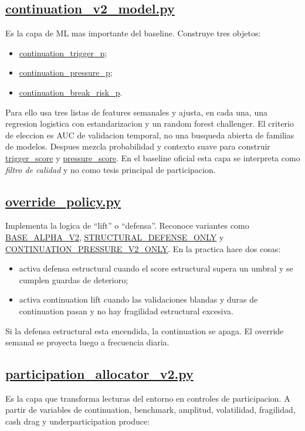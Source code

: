 \documentclass[11pt,letterpaper]{article}
\newcommand{\code}[1]{{\urlstyle{tt}\url{#1}}}
\newcommand{\controlvariant}{\code{CONTINUATION_PRESSURE_V2_ONLY}}
\newcommand{\basealpha}{\code{BASE_ALPHA_V2}}
\begin{document}
\subsection{\code{continuation_v2_model.py}}
Es la capa de ML mas importante del baseline. Construye tres objetos:

\begin{itemize}
    \item \code{continuation_trigger_p};
    \item \code{continuation_pressure_p};
    \item \code{continuation_break_risk_p}.
\end{itemize}

Para ello usa tres listas de features semanales y ajusta, en cada una, una regresion logistica con estandarizacion y un random forest challenger. El criterio de eleccion es AUC de validacion temporal, no una busqueda abierta de familias de modelos. Despues mezcla probabilidad y contexto suave para construir \code{trigger_score} y \code{pressure_score}. En el baseline oficial esta capa se interpreta como \emph{filtro de calidad} y no como tesis principal de participacion.

\subsection{\code{override_policy.py}}
Implementa la logica de \enquote{lift} o \enquote{defensa}. Reconoce variantes como \basealpha, \code{STRUCTURAL_DEFENSE_ONLY} y \controlvariant. En la practica hace dos cosas:

\begin{itemize}
    \item activa defensa estructural cuando el score estructural supera un umbral y se cumplen guardas de deterioro;
    \item activa continuation lift cuando las validaciones blandas y duras de continuation pasan y no hay fragilidad estructural excesiva.
\end{itemize}

Si la defensa estructural esta encendida, la continuation se apaga. El override semanal se proyecta luego a frecuencia diaria.

\subsection{\code{participation_allocator_v2.py}}
Es la capa que transforma lecturas del entorno en controles de participacion. A partir de variables de continuation, benchmark, amplitud, volatilidad, fragilidad, cash drag y underparticipation produce:
\end{document}
